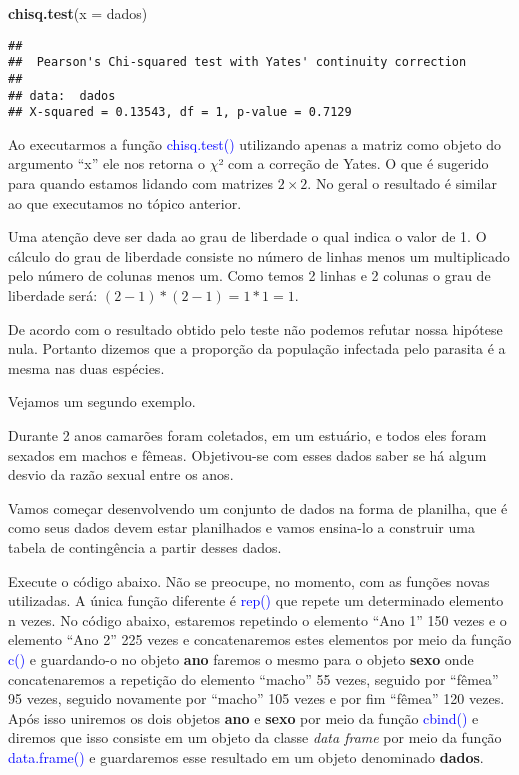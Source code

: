 \documentclass[14pt,titlepage, oneside, openany, a4paper]{book}
\newenvironment{Shaded}{\begin{snugshade}}{\end{snugshade}}
\newcommand{\DataTypeTok}[1]{\textcolor[rgb]{0.13,0.29,0.53}{#1}}
\newcommand{\KeywordTok}[1]{\textcolor[rgb]{0.13,0.29,0.53}{\textbf{#1}}}
\newcommand{\NormalTok}[1]{#1}
\begin{document}
\begin{Shaded}
\begin{Highlighting}[]
\KeywordTok{chisq.test}\NormalTok{(}\DataTypeTok{x =}\NormalTok{ dados)}
\end{Highlighting}
\end{Shaded}

\begin{verbatim}
## 
##  Pearson's Chi-squared test with Yates' continuity correction
## 
## data:  dados
## X-squared = 0.13543, df = 1, p-value = 0.7129
\end{verbatim}

Ao executarmos a função \textcolor{blue}{chisq.test()} utilizando apenas a matriz como objeto do argumento ``x'' ele nos retorna o \(\chi\)² com a correção de Yates. O que é sugerido para quando estamos lidando com matrizes \(2 \times 2\). No geral o resultado é similar ao que executamos no tópico anterior.

Uma atenção deve ser dada ao grau de liberdade o qual indica o valor de 1. O cálculo do grau de liberdade consiste no número de linhas menos um multiplicado pelo número de colunas menos um. Como temos 2 linhas e 2 colunas o grau de liberdade será: \((2-1)*(2-1) = 1*1 = 1\).

De acordo com o resultado obtido pelo teste não podemos refutar nossa hipótese nula. Portanto dizemos que a proporção da população infectada pelo parasita é a mesma nas duas espécies.

Vejamos um segundo exemplo.

Durante 2 anos camarões foram coletados, em um estuário, e todos eles foram sexados em machos e fêmeas. Objetivou-se com esses dados saber se há algum desvio da razão sexual entre os anos.

Vamos começar desenvolvendo um conjunto de dados na forma de planilha, que é como seus dados devem estar planilhados e vamos ensina-lo a construir uma tabela de contingência a partir desses dados.

Execute o código abaixo. Não se preocupe, no momento, com as funções novas utilizadas. A única função diferente é \textcolor{blue}{rep()} que repete um determinado elemento n vezes. No código abaixo, estaremos repetindo o elemento ``Ano 1'' 150 vezes e o elemento ``Ano 2'' 225 vezes e concatenaremos estes elementos por meio da função \textcolor{blue}{c()} e guardando-o no objeto \textbf{ano} faremos o mesmo para o objeto \textbf{sexo} onde concatenaremos a repetição do elemento ``macho'' 55 vezes, seguido por ``fêmea'' 95 vezes, seguido novamente por ``macho'' 105 vezes e por fim ``fêmea'' 120 vezes. Após isso uniremos os dois objetos \textbf{ano} e \textbf{sexo} por meio da função \textcolor{blue}{cbind()} e diremos que isso consiste em um objeto da classe \emph{data frame} por meio da função \textcolor{blue}{data.frame()} e guardaremos esse resultado em um objeto denominado \textbf{dados}.
\end{document}
